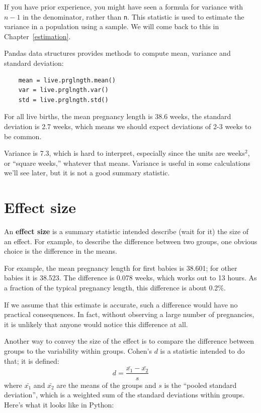 \documentclass[12pt]{book}
\begin{document}
If you have prior experience, you might have seen a formula for
variance with $n-1$ in the denominator, rather than {\tt n}.  This
statistic is used to estimate the variance in a population using a
sample.  We will come back to this in Chapter~\ref{estimation}.

Pandas data structures provides methods to compute mean, variance and
standard deviation:

\begin{verbatim}
    mean = live.prglngth.mean()
    var = live.prglngth.var()
    std = live.prglngth.std()
\end{verbatim}

For all live births, the mean pregnancy length is 38.6 weeks, the
standard deviation is 2.7 weeks, which means we should expect
deviations of 2-3 weeks to be common.

Variance is 7.3, which is hard to interpret, especially since the
units are weeks$^2$, or ``square weeks,'' whatever that means.
Variance is useful in some calculations we'll see later, but it is not
a good summary statistic.


\section{Effect size}

An {\bf effect size} is a summary statistic intended describe (wait
for it) the size of an effect.  For example, to describe the
difference between two groups, one obvious choice is the difference in
the means.  

For example, the mean pregnancy length for first babies is 38.601; for
other babies it is 38.523.  The difference is 0.078 weeks, which works
out to 13 hours.  As a fraction of the typical pregnancy length, this
difference is about 0.2\%.

If we assume that this estimate is accurate, such a difference
would have no practical consequences.  In fact, without
observing a large number of pregnancies, it is unlikely that anyone
would notice this difference at all.

Another way to convey the size of the effect is to compare the
difference between groups to the variability within groups.
Cohen's $d$ is a statistic intended to do that; it is defined:
%
\[ d = \frac{\bar{x_1} - \bar{x_2}}{s}  \]
%
where $\bar{x_1}$ and $\bar{x_2}$ are the means of the groups and
$s$ is the ``pooled standard deviation'', which is a weighted sum of
the standard deviations within groups.  Here's what it looks like in
Python:
\end{document}
